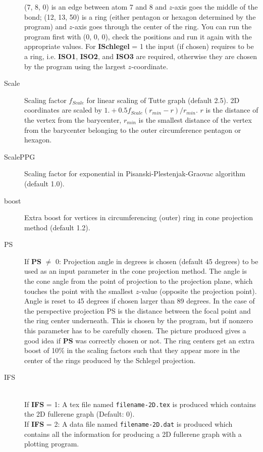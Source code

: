 \documentclass[article,a4paper,twoside]{memoir}
\newcommand{\filename}[1]{\texttt{#1}}
\newcommand{\paramname}[1]{{\color{green}\textbf{#1}}}
\begin{document}
\begin{description}
  (7, 8, 0) is an edge between atom 7 and 8 and $z$-axis goes the middle of the bond; (12, 13, 50) is a ring (either pentagon or hexagon determined
  by the program) and $z$-axis goes through the center of the ring. You can run the program first with (0, 0, 0), check the positions
  and run it again with the appropriate values. For \paramname{ISchlegel} = 1 the input (if chosen) requires to be a ring, i.e.
  \paramname{ISO1}, \paramname{ISO2}, and \paramname{ISO3} are required, otherwise they are chosen by the program using the largest $z$-coordinate.\\
\item[Scale] 
  Scaling factor $f_{Scale}$ for linear scaling of Tutte graph (default  2.5). 2D coordinates are scaled by 
  $1.+0.5f_{Scale}(r_{min}-r)/r_{min}$. $r$ is the distance of the vertex from the barycenter, $r_{min}$ is the smallest distance of the vertex 
  from the barycenter belonging to the outer circumference pentagon or hexagon.
\item[ScalePPG] 
  Scaling factor for exponential in Pisanski-Plestenjak-Graovac algorithm \cite{pisanski95} (default 1.0).
\item[boost] 
  Extra boost for vertices in circumferencing (outer) ring in cone projection method (default 1.2).
\item[PS] 
  If \paramname{PS} $\ne$ 0: Projection angle in degrees is chosen (default 45 degrees)
to be used as an input parameter in the cone projection method. The angle is the cone angle from the point of projection 
to the projection plane, which touches the point with the smallest $z$-value (opposite the projection point). Angle is reset 
to 45 degrees if chosen larger than 89 degrees.  In the case of the perspective projection PS is the distance
between the focal point and the ring center underneath.  This is chosen by the program, but if nonzero this parameter has to be
carefully chosen. The picture produced gives a good idea if \paramname{PS} was correctly chosen or not. The ring centers get
an extra boost of 10\% in the scaling factors such that they appear more in the center of the rings produced by the Schlegel projection.
\item[IFS]\ \\
If \paramname{IFS} = 1: A tex file named \filename{filename-2D.tex} is produced which contains the 2D fullerene graph (Default: 0).\\
If \paramname{IFS} = 2: A data file named \filename{filename-2D.dat} is produced which contains all the information 
for producing a 2D fullerene graph with a plotting program.\\

\end{description}
\end{document}
